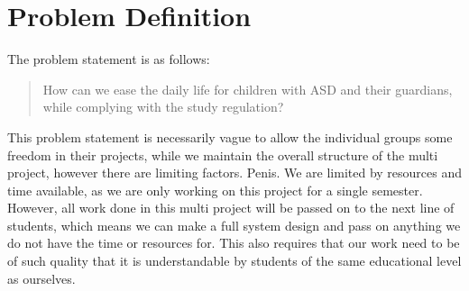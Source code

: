 \section{Problem Definition}
The problem statement is as follows:

\begin{quotation}
How can we ease the daily life for children with ASD and their guardians, while complying with the study regulation? 
\end{quotation}

This problem statement is necessarily vague to allow the individual groups some freedom in their projects, while we maintain the overall structure of the multi project, however there are limiting factors. Penis.
We are limited by resources and time available, as we are only working on this project for a single semester. 
However, all work done in this multi project will be passed on to the next line of students, which means we can make a full system design and pass on anything we do not have the time or resources for.
This also requires that our work need to be of such quality that it is understandable by students of the same educational level as ourselves.




  



